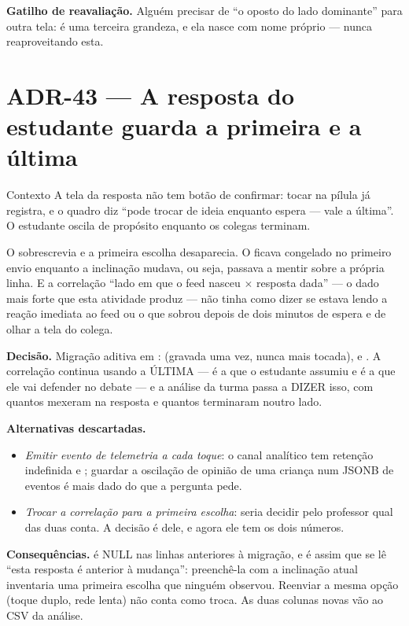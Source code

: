 \textbf{Gatilho de reavaliação.} Alguém precisar de ``o oposto do lado
dominante'' para outra tela: é uma terceira grandeza, e ela nasce com nome
próprio --- nunca reaproveitando esta.


\section{ADR-43 --- A resposta do estudante guarda a primeira e a última}
\label{adr:conclusao-primeira}

\begin{especificacao}{Contexto}
A tela da resposta não tem botão de confirmar: tocar na pílula já registra, e o
quadro diz ``pode trocar de ideia enquanto espera --- vale a última''. O estudante
oscila de propósito enquanto os colegas terminam.

O  sobrescrevia  e a primeira escolha desaparecia. O
 ficava congelado no primeiro envio enquanto a inclinação
mudava, ou seja, passava a mentir sobre a própria linha. E a correlação ``lado
em que o feed nasceu $\times$ resposta dada'' --- o dado mais forte que esta
atividade produz --- não tinha como dizer se estava lendo a reação imediata ao
feed ou o que sobrou depois de dois minutos de espera e de olhar a tela do
colega.
\end{especificacao}

\textbf{Decisão.} Migração aditiva em :
 (gravada uma vez, nunca mais tocada),  e
. A correlação continua usando a ÚLTIMA --- é a que o estudante
assumiu e é a que ele vai defender no debate --- e a análise da turma passa a
DIZER isso, com quantos mexeram na resposta e quantos terminaram noutro lado.

\textbf{Alternativas descartadas.}
\begin{itemize}
  \item \emph{Emitir evento de telemetria a cada toque}: o canal analítico tem
    retenção indefinida e ; guardar a oscilação de opinião de uma
    criança num JSONB de eventos é mais dado do que a pergunta pede.
  \item \emph{Trocar a correlação para a primeira escolha}: seria decidir pelo
    professor qual das duas conta. A decisão é dele, e agora ele tem os dois
    números.
\end{itemize}

\textbf{Consequências.}  é NULL nas linhas anteriores à
migração, e é assim que se lê ``esta resposta é anterior à mudança'':
preenchê-la com a inclinação atual inventaria uma primeira escolha que ninguém
observou. Reenviar a mesma opção (toque duplo, rede lenta) não conta como troca.
As duas colunas novas vão ao CSV da análise.

